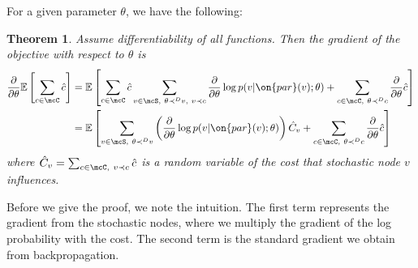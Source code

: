\documentclass[12pt]{report}
\newtheorem{theorem}{Theorem}
\begin{document}
For a given parameter $\theta$, we have the following:
\begin{theorem}
Assume differentiability of all functions. Then the gradient of the objective with respect to $\theta$ is
\begin{align}
\frac{\partial}{\partial \theta} \mathbb{E}\left[ \sum_{c \in \mcC} \hat{c} \right] &= \mathbb{E}\left[\sum_{c \in \mcC} \hat{c} \sum_{v \in \mcS,~\theta \prec^D v, ~v \prec c }  \frac{\partial}{\partial\theta} \log p(v | \on{par}(v) ; \theta )  +
 \sum_{c\in \mcC,~\theta \prec^D c} \frac{\partial}{\partial \theta} \hat{c}
\right] \label{eq:gradient1} \\
&=  \mathbb{E}\left[ \sum_{v \in \mcS,~\theta \prec^D v} \left( \frac{\partial}{\partial\theta} \log p(v | \on{par}(v) ; \theta ) \right) \hat{C}_v + \sum_{c\in \mcC,~\theta \prec^D c} \frac{\partial}{\partial \theta} \hat{c} \label{eq:gradient2}
\right] 
\end{align}
where $\hat{C}_v = \sum_{c \in \mcC, ~v \prec c} \hat{c}$ is a random variable of the cost that stochastic node $v$ influences.
\label{thm:gradient}
\end{theorem}
Before we give the proof, we note the intuition. The first term represents the gradient from the stochastic nodes, where we multiply the gradient of the log probability with the cost.
The second term is the standard gradient we obtain from backpropagation.
\end{document}
